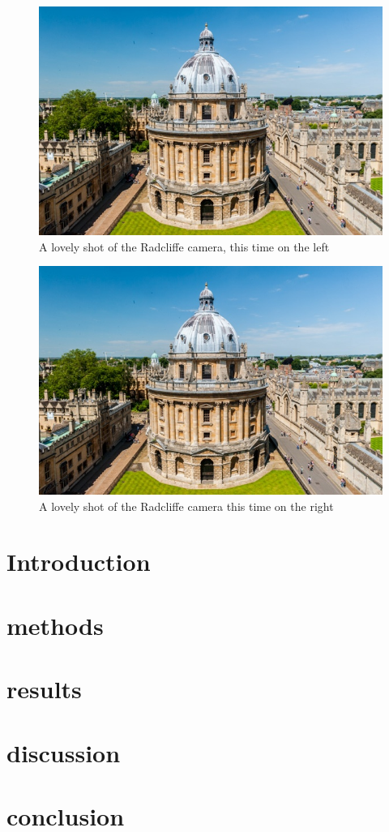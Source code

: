 \documentclass[../main.tex]{subfiles}
\begin{document}
\begin{figure}[H]
    \includegraphics[width=0.3\linewidth,left]{Chapter5/images/Radcliffe-Camera-8163.jpg}
    \caption{A lovely shot of the Radcliffe camera, this time on the left}
    \label{fig:enter-label}
\end{figure}

\begin{figure}[H]
    \includegraphics[width=0.3\linewidth,right]{Chapter5/images/Radcliffe-Camera-8163.jpg}
    \caption{A lovely shot of the Radcliffe camera this time on the right}
    \label{fig:enter-label}
\end{figure}

\section{Introduction}
\section{methods}
\section{results}
\section{discussion}
\section{conclusion}
\end{document}
